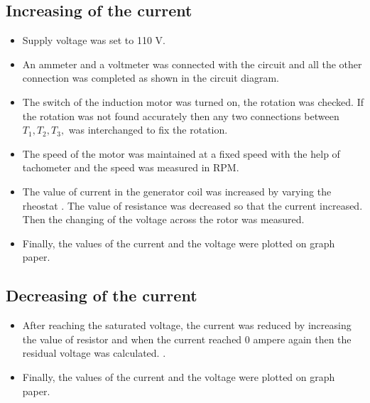 \subsection{Increasing of the current}
\begin{itemize}

    \item Supply voltage was set to 110 V.
    
    \item An ammeter and a voltmeter was connected with the circuit and all the other connection was completed as shown in the circuit diagram.
    
    \item The switch of the induction motor was turned on, the rotation was checked. If the rotation was not found accurately then any two connections between $T_1, T_2, T_3,$ was interchanged to fix the rotation. 
    
    \item The speed of the motor was maintained at a fixed speed with the help of tachometer and the speed was measured in RPM. 
    
    \item The value of current in the generator coil was increased by varying the rheostat . The value of resistance was decreased so that the current increased. Then the changing of the voltage across the rotor was measured.
    
    \item Finally, the values of the current and the voltage were plotted on graph paper.
    
\end{itemize}



\subsection{Decreasing of the current}
\begin{itemize}

    \item After reaching the saturated voltage, the current was reduced by increasing the value of resistor and when the current reached 0 ampere again then the residual voltage was calculated.
    .
    \item Finally, the values of the current and the voltage were plotted on graph paper.
    
\end{itemize}



